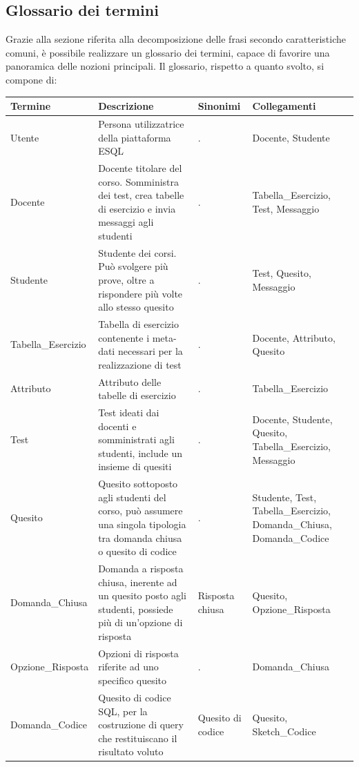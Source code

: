 \documentclass{article}
\begin{document}
\newpage
\subsection{Glossario dei termini}
\large
Grazie alla sezione riferita alla decomposizione delle frasi secondo caratteristiche comuni, è possibile realizzare un glossario dei termini, capace di favorire una panoramica delle nozioni principali. Il glossario, rispetto a quanto svolto, si compone di:
\begin{table}[H]
    \centering
       \begin{tabularx}{\textwidth}{|X|p{6cm}|X|X|}
        \hline
        \bf Termine & \bf Descrizione & \bf Sinonimi & \bf Collegamenti \\
        \hline
        Utente & Persona utilizzatrice della piattaforma ESQL & . & Docente, Studente \\
        \hline
        Docente & Docente titolare del corso. Somministra dei test, crea tabelle di esercizio e invia messaggi agli studenti & . & Tabella\_Esercizio, Test, Messaggio \\
        \hline
        Studente & Studente dei corsi. Può svolgere più prove, oltre a rispondere più volte allo stesso quesito & . & Test, Quesito, Messaggio \\
        \hline
        Tabella\_Esercizio & Tabella di esercizio contenente i meta-dati necessari per la realizzazione di test & . & Docente, Attributo, Quesito \\
        \hline
        Attributo & Attributo delle tabelle di esercizio & . & Tabella\_Esercizio \\
        \hline
        Test & Test ideati dai docenti e somministrati agli studenti, include un insieme di quesiti & . & Docente, Studente, Quesito, Tabella\_Esercizio, Messaggio \\
        \hline 
        Quesito & Quesito sottoposto agli studenti del corso, può assumere una singola tipologia tra domanda chiusa o quesito di codice & . & Studente, Test, Tabella\_Esercizio, Domanda\_Chiusa, Domanda\_Codice \\
        \hline
        Domanda\_Chiusa & Domanda a risposta chiusa, inerente ad un quesito posto agli studenti, possiede più di un'opzione di risposta & Risposta chiusa & Quesito, Opzione\_Risposta \\
        \hline
        Opzione\_Risposta & Opzioni di risposta riferite ad uno specifico quesito & . & Domanda\_Chiusa \\
        \hline
        Domanda\_Codice & Quesito di codice SQL, per la costruzione di query che restituiscano il risultato voluto & Quesito di codice & Quesito, Sketch\_Codice \\

\end{tabularx}
\end{table}
\end{document}
